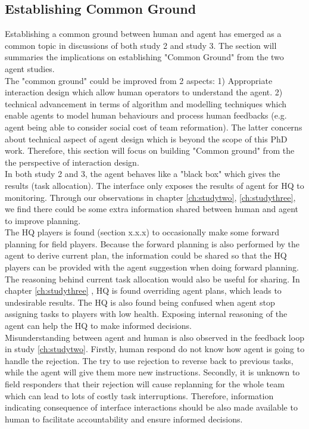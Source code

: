 \subsection{Establishing Common Ground}
Establishing a common ground between human and agent has emerged as a common topic in discussions of both study 2 and study 3. The section will summaries the implications on establishing "Common Ground" from the two agent studies. \\

The "common ground" could be improved from 2 aspects:  1) Appropriate interaction design which allow human operators to understand the agent. 2) technical advancement in terms of algorithm and modelling techniques which enable agents to model human behaviours and process human feedbacks (e.g. agent being able to consider social cost of team reformation). The latter concerns about technical aspect of agent design which is beyond the scope of this PhD work. Therefore, this section will focus on building "Common ground" from the the perspective of interaction design. \\

In both study 2 and 3, the agent behaves like a "black box" which gives the results (task allocation). The interface only exposes the results of agent for HQ to monitoring. Through our observations in chapter \ref{ch:studytwo}, \ref{ch:studythree}, we find there could be some extra information shared between human and agent to improve planning.\\

The HQ players is found (section x.x.x) to occasionally make some forward planning for field players. Because the forward planning is also performed by the agent to derive current plan, the information could be shared so that the HQ players can be provided with the agent suggestion when doing forward planning.\\

The reasoning behind current task allocation would also be useful for sharing. In chapter \ref{ch:studythree} , HQ is found overriding agent plans, which leads to undesirable results. The HQ is also found being confused when agent stop assigning tasks to players with low health. Exposing internal reasoning of the agent can help the HQ to make informed decisions. \\

Misunderstanding between agent and human is also observed in the feedback loop in study \ref{ch:studytwo}. Firstly, human respond do not know how agent is going to handle the rejection. The try to use rejection to reverse back to previous tasks, while the agent will give them more new instructions. Secondly, it is unknown to field responders that their rejection will cause replanning for the whole team which can lead to lots of costly task interruptions. Therefore, information indicating consequence of interface interactions should be also made available to human to facilitate accountability and ensure informed decisions. \\

